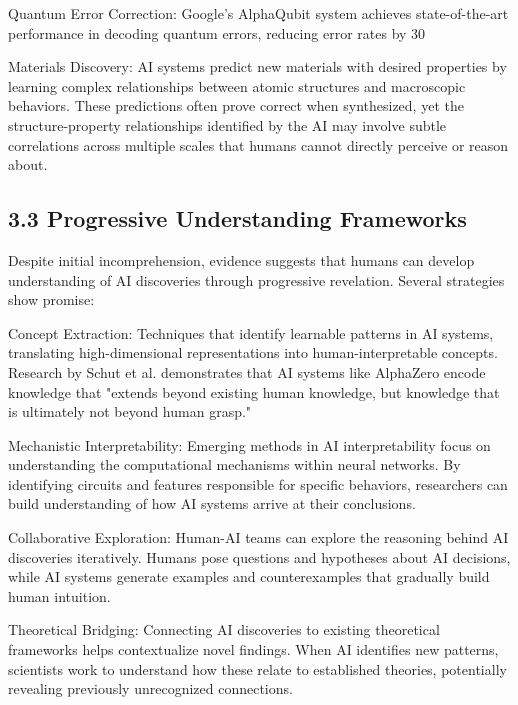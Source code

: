 \documentclass{article}
\begin{document}
Quantum Error Correction: Google's AlphaQubit system achieves state-of-the-art performance in decoding quantum errors, reducing error rates by 30%


Materials Discovery: AI systems predict new materials with desired properties by learning complex relationships between atomic structures and macroscopic behaviors. These predictions often prove correct when synthesized, yet the structure-property relationships identified by the AI may involve subtle correlations across multiple scales that humans cannot directly perceive or reason about.


\subsection{3.3 Progressive Understanding Frameworks}

Despite initial incomprehension, evidence suggests that humans can develop understanding of AI discoveries through progressive revelation. Several strategies show promise:


Concept Extraction: Techniques that identify learnable patterns in AI systems, translating high-dimensional representations into human-interpretable concepts. Research by Schut et al. demonstrates that AI systems like AlphaZero encode knowledge that "extends beyond existing human knowledge, but knowledge that is ultimately not beyond human grasp."


Mechanistic Interpretability: Emerging methods in AI interpretability focus on understanding the computational mechanisms within neural networks. By identifying circuits and features responsible for specific behaviors, researchers can build understanding of how AI systems arrive at their conclusions.


Collaborative Exploration: Human-AI teams can explore the reasoning behind AI discoveries iteratively. Humans pose questions and hypotheses about AI decisions, while AI systems generate examples and counterexamples that gradually build human intuition.


Theoretical Bridging: Connecting AI discoveries to existing theoretical frameworks helps contextualize novel findings. When AI identifies new patterns, scientists work to understand how these relate to established theories, potentially revealing previously unrecognized connections.
\end{document}
